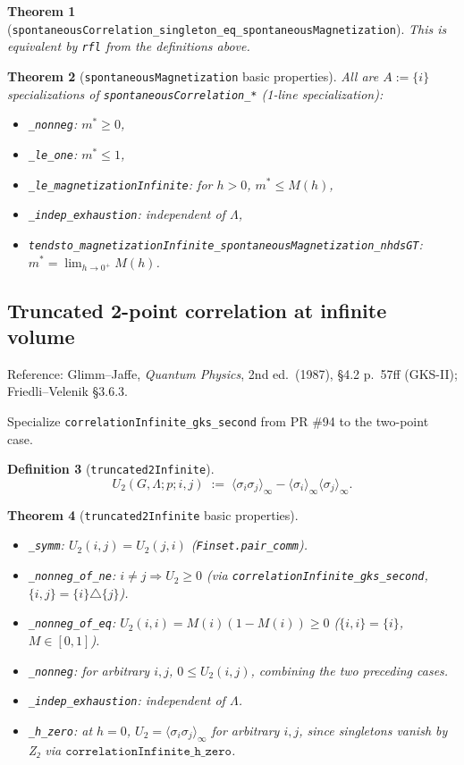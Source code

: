 \documentclass[a4paper,11pt]{article}
\newtheorem{theorem}{Theorem}
\newtheorem{definition}[theorem]{Definition}
\begin{document}
\begin{theorem}[\texttt{spontaneousCorrelation\_singleton\_eq\_spontaneousMagnetization}]
This is equivalent by \texttt{rfl} from the definitions above.
\end{theorem}

\begin{theorem}[\texttt{spontaneousMagnetization} basic properties]
All are $A := \{i\}$ specializations of \texttt{spontaneousCorrelation\_*}
(1-line specialization):
\begin{itemize}
\item \texttt{\_nonneg}: $m^* \ge 0$,
\item \texttt{\_le\_one}: $m^* \le 1$,
\item \texttt{\_le\_magnetizationInfinite}: for $h > 0$, $m^* \le M(h)$,
\item \texttt{\_indep\_exhaustion}: independent of $\Lambda$,
\item \texttt{tendsto\_magnetizationInfinite\_spontaneousMagnetization\_nhdsGT}:
      $m^* = \lim_{h \to 0^+} M(h)$.
\end{itemize}
\end{theorem}

\subsection{Truncated 2-point correlation at infinite volume}

Reference: Glimm--Jaffe, \textit{Quantum Physics}, 2nd ed.\ (1987),
\S 4.2 p.\ 57ff (GKS-II); Friedli--Velenik \S 3.6.3.

Specialize \texttt{correlationInfinite\_gks\_second} from PR \#94 to the
two-point case.

\begin{definition}[\texttt{truncated2Infinite}]
\[
U_2(G, \Lambda; p; i, j)
  \;:=\; \langle \sigma_i \sigma_j \rangle_\infty
    - \langle \sigma_i \rangle_\infty \langle \sigma_j \rangle_\infty.
\]
\end{definition}

\begin{theorem}[\texttt{truncated2Infinite} basic properties]
\begin{itemize}
\item \texttt{\_symm}: $U_2(i, j) = U_2(j, i)$ (\texttt{Finset.pair\_comm}).
\item \texttt{\_nonneg\_of\_ne}: $i \ne j \Rightarrow U_2 \ge 0$
      (via \texttt{correlationInfinite\_gks\_second},
      $\{i,j\} = \{i\} \triangle \{j\}$).
\item \texttt{\_nonneg\_of\_eq}: $U_2(i, i) = M(i)(1 - M(i)) \ge 0$
      ($\{i, i\} = \{i\}$, $M \in [0, 1]$).
\item \texttt{\_nonneg}: for arbitrary $i, j$, $0 \le U_2(i, j)$, combining
      the two preceding cases.
\item \texttt{\_indep\_exhaustion}: independent of $\Lambda$.
\item \texttt{\_h\_zero}: at $h = 0$,
      $U_2 = \langle \sigma_i \sigma_j \rangle_\infty$ for arbitrary
      $i, j$, since singletons vanish by Z₂ via
      $\texttt{correlationInfinite\_h\_zero}$.
\end{itemize}
\end{theorem}
\end{document}
